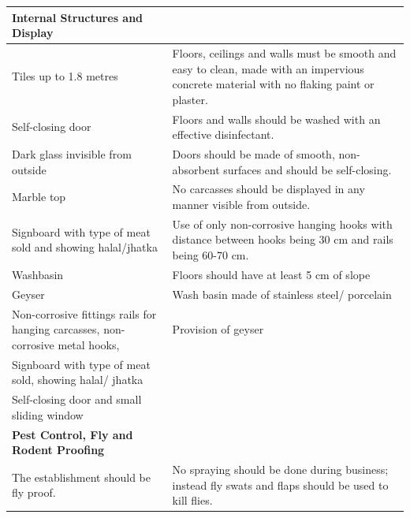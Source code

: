 \documentclass[a4paper, 12pt, twoside]{article}
\newcommand\tabitem{\makebox[1em][r]{\textbullet~}}
\begin{document}
\begin{longtable}[l]{>{\raggedright}p{6.5cm}>{\raggedright\arraybackslash}p{8.5cm}}
  \textbf{Internal Structures and Display} 	&	\\
    \midrule
   \tabitem  Tiles up to 1.8 metres	& 	\tabitem Floors, ceilings and walls must be smooth and easy to clean, made with an impervious concrete material with no flaking paint or plaster.\\
\newline{} \tabitem Self-closing door	&	\newline{} \tabitem Floors and walls should be washed with an effective disinfectant.\\
\newline{} \tabitem Dark glass invisible from outside	&	 \newline{} \tabitem Doors should be made of smooth, non-absorbent surfaces and should be self-closing.\\
\newline{} \tabitem Marble top 	&	 \newline{}\tabitem No carcasses should be displayed in any manner visible from outside.\\
\newline{} \tabitem Signboard with type of meat sold and showing halal/jhatka 	&	 \newline{} \tabitem Use of only non-corrosive hanging hooks with distance between hooks being 30 cm and rails being 60-70 cm.\\
\newline{} \tabitem Washbasin 	&	 \newline{} \tabitem Floors should have at least 5 cm of slope\\
\newline{} \tabitem Geyser	&	 \newline{} \tabitem Wash basin made of stainless steel/ porcelain\\
\newline{} \tabitem Non-corrosive fittings rails for hanging carcasses, non-corrosive metal hooks,	&	\newline{} \tabitem Provision of geyser \\
\newline{} \tabitem Signboard with type of meat sold, showing halal/ jhatka	&		\\
\newline{} \tabitem Self-closing door and small sliding window	&	\\
    \midrule
 \textbf{Pest Control, Fly and Rodent Proofing} 	&	\\
    \midrule
	\tabitem The establishment should be fly proof. & \tabitem No spraying should be done during business; instead fly swats and flaps should be used to kill flies.\\

\end{longtable}
\end{document}
